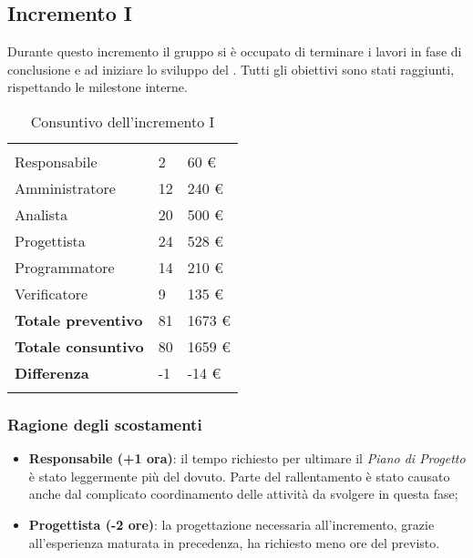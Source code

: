 \subsection{Incremento I}
Durante questo incremento il gruppo si è occupato di terminare i lavori in fase di conclusione e ad iniziare lo sviluppo del . Tutti gli obiettivi sono stati raggiunti, rispettando le milestone interne.
{
\setlength\arrayrulewidth{1pt}
\begin{longtable}{ C{4cm} C{3cm} C{3.5cm}} 
 	 &
 	 &
 	 \\
 	
 	Responsabile & 2  & 60 € \\
 	Amministratore & 12 & 240 €\\
 	Analista & 20 & 500 € \\
 	Progettista & 24  & 528 € \\
 	Programmatore & 14 & 210 € \\
 	Verificatore & 9  & 135 €\\
 	
	\hline 	
 	
 	\textbf{Totale preventivo} &
	81 &
 	1673 € \\		
 	
 	\textbf{Totale consuntivo} &
	80 &
 	1659 € \\	
 	
 	\textbf{Differenza} &
	-1 &
 	-14 € \\	
 	
 	\caption{Consuntivo dell'incremento I}
\end{longtable}
}

\subsubsection{Ragione degli scostamenti}

\begin{itemize}
\item \textbf{Responsabile (+1 ora)}: il tempo richiesto per ultimare il \textit{Piano di Progetto} è stato leggermente più del dovuto. Parte del rallentamento è stato causato anche dal complicato coordinamento delle attività da svolgere in questa fase;

\item \textbf{Progettista (-2 ore)}: la progettazione necessaria all'incremento, grazie all'esperienza maturata in precedenza, ha richiesto meno ore del previsto.

\end{itemize}

